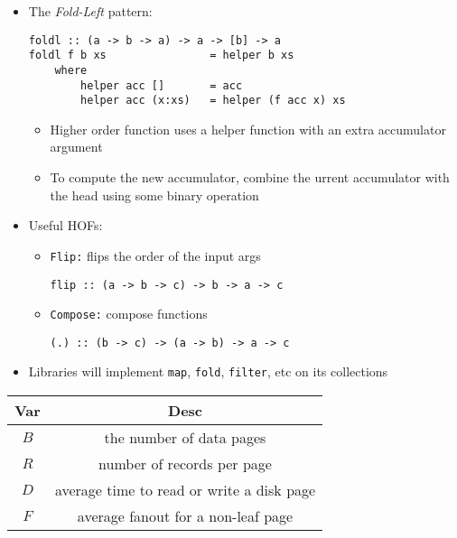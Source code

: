\documentclass[landscape,8pt]{extarticle}
\newcommand{\code}{\lstinline}
\begin{document}
\begin{multicols}{4}
\begin{itemize}
\begin{itemize}
                \item \code{cat = foldr (\x n -> x ++ n) ""}
            \end{itemize}
            \item The \emph{Fold-Left} pattern:
            \begin{lstlisting}
foldl :: (a -> b -> a) -> a -> [b] -> a
foldl f b xs                = helper b xs
    where
        helper acc []       = acc
        helper acc (x:xs)   = helper (f acc x) xs
            \end{lstlisting}
            \begin{itemize}
                \item Higher order function uses a helper function with an extra accumulator argument
                \item To compute the new accumulator, combine the urrent accumulator with the head using some binary operation
            \end{itemize}
            \item Useful HOFs:
            \begin{itemize}
                \item \code{Flip:} flips the order of the input args
                \begin{lstlisting}
flip :: (a -> b -> c) -> b -> a -> c
                \end{lstlisting}
                \item \code{Compose:} compose functions
                \begin{lstlisting}
(.) :: (b -> c) -> (a -> b) -> a -> c
                \end{lstlisting}
            \end{itemize}
            \item Libraries will implement \code{map}, \code{fold}, \code{filter}, etc on its collections
    \end{itemize}
    \begin{center}
        \begin{tabular}{ | c | c | } \toprule
            Var & Desc                                      \\ \midrule
            $B$ & the number of data pages                  \\ \midrule
            $R$ & number of records per page                \\ \midrule
            $D$ & average time to read or write a disk page \\ \midrule
            $F$ & average fanout for a non-leaf page        \\ \bottomrule

\end{tabular}
\end{center}
\end{multicols}
\end{document}
